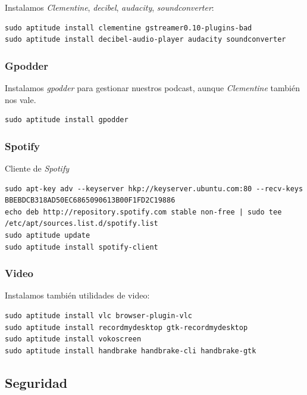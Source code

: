 \documentclass[12pt,spanish,]{scrartcl}
\begin{document}
Instalamos \emph{Clementine}, \emph{decibel}, \emph{audacity},
\emph{soundconverter}:

\begin{verbatim}
sudo aptitude install clementine gstreamer0.10-plugins-bad
sudo aptitude install decibel-audio-player audacity soundconverter
\end{verbatim}

\subsubsection{Gpodder}\label{gpodder}

Instalamos \emph{gpodder} para gestionar nuestros podcast, aunque
\emph{Clementine} también nos vale.

\begin{verbatim}
sudo aptitude install gpodder
\end{verbatim}

\subsubsection{Spotify}\label{spotify}

Cliente de \emph{Spotify}

\begin{verbatim}
sudo apt-key adv --keyserver hkp://keyserver.ubuntu.com:80 --recv-keys BBEBDCB318AD50EC6865090613B00F1FD2C19886
echo deb http://repository.spotify.com stable non-free | sudo tee /etc/apt/sources.list.d/spotify.list
sudo aptitude update
sudo aptitude install spotify-client
\end{verbatim}

\subsubsection{Video}\label{video}

Instalamos también utilidades de video:

\begin{verbatim}
sudo aptitude install vlc browser-plugin-vlc
sudo aptitude install recordmydesktop gtk-recordmydesktop
sudo aptitude install vokoscreen
sudo aptitude install handbrake handbrake-cli handbrake-gtk
\end{verbatim}

\subsection{Seguridad}\label{seguridad}
\end{document}
